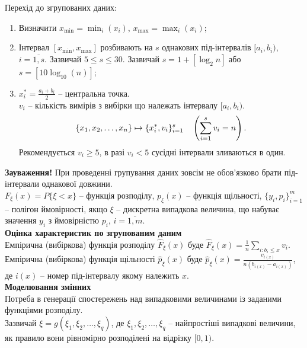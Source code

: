 Перехід до згрупованих даних:
\begin{enumerate}
    \item Визначити $x_{\min} = \min_i (x_i)$, $x_{\max} = \max_i (x_i)$;
    
    \item Інтервал $[x_{\min}, x_{\max}]$ розбивають на $s$ однакових під-інтервалів $[a_i, b_i)$, $i = \overline{1,s}$. Зазвичай $5 \le s \le 30$. Зазвичай $s = 1 + [\log_2 n]$ або $s = [10 \log_{10} (n)]$;
    
    \item $x_i^* = \frac{a_i + b_i}{2}$ -- центральна точка. \\
    
    $v_i$ -- кількість вимірів з вибірки що належать інтервалу $[a_i, b_i)$. \[ \{x_1, x_2, \ldots, x_n\} \mapsto \{x_i^*, v_i\}_{i=1}^s \quad \left( \displaystyle\sum\limits_{i=1}^s v_i = n \right). \] Рекомендується $v_i \ge 5$, в разі $v_i < 5$ сусідні інтервали зливаються в один.
\end{enumerate}

\textbf{Зауваження!} При проведенні групування даних зовсім не обов'язково брати під-інтервали однакової довжини. \\

$F_\xi (x) = P\{ \xi < x\}$ -- функція розподілу, $p_\xi(x)$ -- функція щільності, $\{ y_i, p_i \}_{i=1}^m$ -- полігон ймовірності, якщо $\xi$ -- дискретна випадкова величина, що набуває значення $y_i$ з ймовірністю $p_i$, $i=\overline{1,m}$. \\

\textbf{Оцінка характеристик по згрупованим даним} \\

Емпірична (вибіркова) функція розподілу $\widehat{F}_\xi (x)$ буде $\widehat{F}_\xi (x) = \frac{1}{n} \sum_{i: b_i \le x} v_i$. \\

Емпірична (вибіркова) функція щільності $\widehat{p}_\xi (x)$ буде $\widehat{p}_\xi (x) = \frac{v_{i(x)}}{n (b_{i(x)} - a_{i(x)})}$, де $i(x)$ -- номер під-інтервалу якому належить $x$. \\

\textbf{Моделювання змінних} \\

Потреба в генерації спостережень над випадковими величинами із заданими функціями розподілу. \\

Зазвичай $\xi = g(\xi_1, \xi_2, \ldots, \xi_q)$, де $\xi_1, \xi_2, \ldots, \xi_q$ -- найпростіші випадкові величини, як правило вони рівномірно розподілені на відрізку $[0, 1)$. \\

